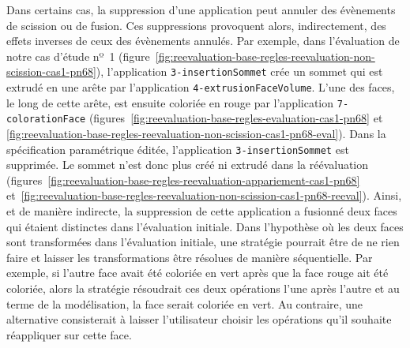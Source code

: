 Dans certains cas, la suppression d'une application peut annuler des évènements
de scission ou de fusion. %
Ces suppressions provoquent alors, indirectement, des effets inverses de ceux des
évènements annulés. %
Par exemple, dans l'évaluation de notre cas d'étude nº~1
(figure~\ref{fig:reevaluation-base-regles-reevaluation-non-scission-cas1-pn68}),
l'application \texttt{3-\allowbreak{}insertion\-Sommet} crée un sommet qui est extrudé en une arête par
l'application \texttt{4-\allowbreak{}extrusion\-Face\-Volume}. %
L'une des faces, le long de cette arête, est ensuite coloriée en rouge par
l'application \texttt{7-\allowbreak{}coloration\-Face}
(figures~\ref{fig:reevaluation-base-regles-evaluation-cas1-pn68} et
\ref{fig:reevaluation-base-regles-reevaluation-non-scission-cas1-pn68-eval}). %
Dans la spécification paramétrique éditée, l'application \texttt{3-\allowbreak{}insertion\-Sommet} est
supprimée. %
Le sommet n'est donc plus créé ni extrudé dans la réévaluation
(figures~\ref{fig:reevaluation-base-regles-reevaluation-appariement-cas1-pn68}
et~\ref{fig:reevaluation-base-regles-reevaluation-non-scission-cas1-pn68-reeval}). %
Ainsi, et de manière indirecte, la suppression de cette application a fusionné
deux faces qui étaient distinctes dans l'évaluation initiale. %
Dans l'hypothèse où les deux faces sont transformées dans l'évaluation initiale,
une stratégie pourrait être de ne rien faire et laisser les transformations être
résolues de manière séquentielle. %
Par exemple, si l'autre face avait été coloriée en vert après que la face rouge
ait été coloriée, alors la stratégie résoudrait ces deux opérations l'une après
l'autre et au terme de la modélisation, la face serait coloriée en vert. %
Au contraire, une alternative consisterait à laisser l'utilisateur choisir les
opérations qu'il souhaite réappliquer sur cette face. %








